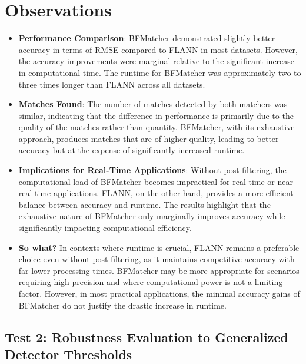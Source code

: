 \section*{Observations}
\begin{itemize}
    \item \textbf{Performance Comparison}: BFMatcher demonstrated slightly better accuracy in terms of RMSE compared to FLANN in most datasets. However, the accuracy improvements were marginal relative to the significant increase in computational time. The runtime for BFMatcher was approximately two to three times longer than FLANN across all datasets.
    
    \item \textbf{Matches Found}: The number of matches detected by both matchers was similar, indicating that the difference in performance is primarily due to the quality of the matches rather than quantity. BFMatcher, with its exhaustive approach, produces matches that are of higher quality, leading to better accuracy but at the expense of significantly increased runtime.

    \item \textbf{Implications for Real-Time Applications}: Without post-filtering, the computational load of BFMatcher becomes impractical for real-time or near-real-time applications. FLANN, on the other hand, provides a more efficient balance between accuracy and runtime. The results highlight that the exhaustive nature of BFMatcher only marginally improves accuracy while significantly impacting computational efficiency.

    \item \textbf{So what?} In contexts where runtime is crucial, FLANN remains a preferable choice even without post-filtering, as it maintains competitive accuracy with far lower processing times. BFMatcher may be more appropriate for scenarios requiring high precision and where computational power is not a limiting factor. However, in most practical applications, the minimal accuracy gains of BFMatcher do not justify the drastic increase in runtime.
\end{itemize}





\subsection*{Test 2: Robustness Evaluation to Generalized Detector Thresholds}

